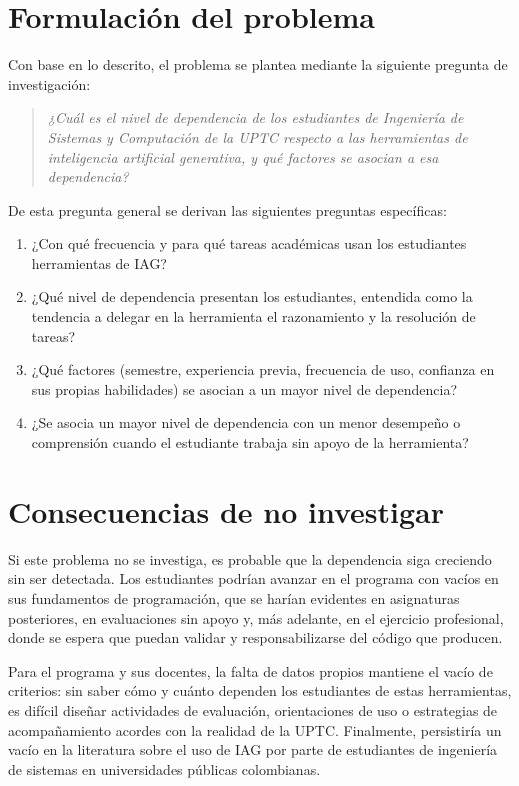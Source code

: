 \documentclass[12pt,a4paper,oneside]{report}
\begin{document}
\section{Formulación del problema}

Con base en lo descrito, el problema se plantea mediante la siguiente pregunta de investigación:

\begin{quote}
\textit{¿Cuál es el nivel de dependencia de los estudiantes de Ingeniería de Sistemas y Computación de la UPTC respecto a las herramientas de inteligencia artificial generativa, y qué factores se asocian a esa dependencia?}
\end{quote}

De esta pregunta general se derivan las siguientes preguntas específicas:

\begin{enumerate}
  \item ¿Con qué frecuencia y para qué tareas académicas usan los estudiantes herramientas de IAG?
  \item ¿Qué nivel de dependencia presentan los estudiantes, entendida como la tendencia a delegar en la herramienta el razonamiento y la resolución de tareas?
  \item ¿Qué factores (semestre, experiencia previa, frecuencia de uso, confianza en sus propias habilidades) se asocian a un mayor nivel de dependencia?
  \item ¿Se asocia un mayor nivel de dependencia con un menor desempeño o comprensión cuando el estudiante trabaja sin apoyo de la herramienta?
\end{enumerate}

\section{Consecuencias de no investigar}

Si este problema no se investiga, es probable que la dependencia siga creciendo sin ser detectada. Los estudiantes podrían avanzar en el programa con vacíos en sus fundamentos de programación, que se harían evidentes en asignaturas posteriores, en evaluaciones sin apoyo y, más adelante, en el ejercicio profesional, donde se espera que puedan validar y responsabilizarse del código que producen.

Para el programa y sus docentes, la falta de datos propios mantiene el vacío de criterios: sin saber cómo y cuánto dependen los estudiantes de estas herramientas, es difícil diseñar actividades de evaluación, orientaciones de uso o estrategias de acompañamiento acordes con la realidad de la UPTC. Finalmente, persistiría un vacío en la literatura sobre el uso de IAG por parte de estudiantes de ingeniería de sistemas en universidades públicas colombianas.
\end{document}
